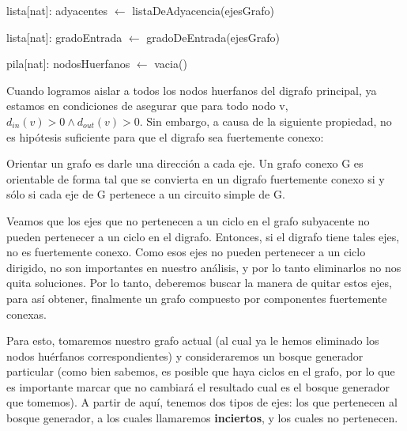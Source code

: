 \begin{algorithm}[H]
	\NoCaptionOfAlgo
	\caption{}
	
	lista[nat]: adyacentes $\leftarrow$ listaDeAdyacencia(ejesGrafo)

	lista[nat]: gradoEntrada $\leftarrow$ gradoDeEntrada(ejesGrafo)

	pila[nat]: nodosHuerfanos $\leftarrow$ vacia()

\end{algorithm}


Cuando logramos aislar a todos los nodos huerfanos del digrafo principal, ya estamos en condiciones de asegurar que para todo nodo v, $d_{in} (v) > 0 \land d_{out} (v) > 0$. Sin embargo, a causa de la siguiente propiedad, no es hipótesis suficiente para que el digrafo sea fuertemente conexo:

\begin{center}
Orientar un grafo es darle una dirección a cada eje. Un grafo conexo G es orientable de forma tal que se convierta en un digrafo fuertemente conexo si y sólo si cada eje de G pertenece a un circuito simple de G.
\end{center}

Veamos que los ejes que no pertenecen a un ciclo en el grafo subyacente no pueden pertenecer a un ciclo en el digrafo. Entonces, si el digrafo tiene tales ejes, no es fuertemente conexo. Como esos ejes no pueden pertenecer a un ciclo dirigido, no son importantes en nuestro análisis, y por lo tanto eliminarlos no nos quita soluciones. Por lo tanto, deberemos buscar la manera de quitar estos ejes, para así obtener, finalmente un grafo compuesto por componentes fuertemente conexas.

Para esto, tomaremos nuestro grafo actual (al cual ya le hemos eliminado los nodos huérfanos correspondientes) y consideraremos un bosque generador particular (como bien sabemos, es posible que haya ciclos en el grafo, por lo que es importante marcar que no cambiará el resultado cual es el bosque generador que tomemos). A partir de aquí, tenemos dos tipos de ejes: los que pertenecen al bosque generador, a los cuales llamaremos \textbf{inciertos}, y los cuales no pertenecen.

